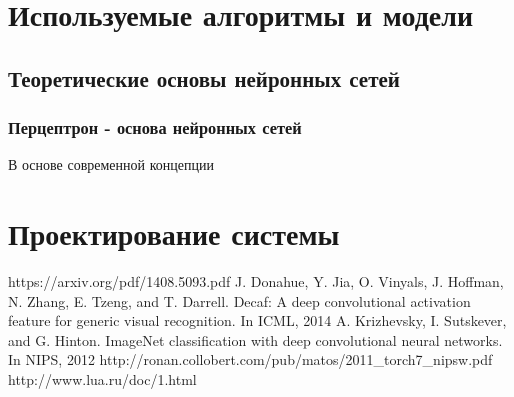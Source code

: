\documentclass[a4paper,english,russian]{G2-105}
\begin{document}
\chapter{Используемые алгоритмы и модели}
\section{Теоретические основы нейронных сетей}
\subsection{Перцептрон - основа нейронных сетей}
\par В основе современной концепции 

\chapter{Проектирование системы}


\newpage
{}
\newpage
\begin{thebibliography}{1}
     https://arxiv.org/pdf/1408.5093.pdf
     J. Donahue, Y. Jia, O. Vinyals, J. Hoffman, N. Zhang, 
E. Tzeng, and T. Darrell. Decaf: A deep convolutional
activation feature for generic visual recognition. In ICML,
2014
  	  A. Krizhevsky, I. Sutskever, and G. Hinton. ImageNet
classification with deep convolutional neural networks. In
NIPS, 2012
	 http://ronan.collobert.com/pub/matos/2011\_torch7\_nipsw.pdf
	 http://www.lua.ru/doc/1.html
\end{thebibliography}


\end{document}
